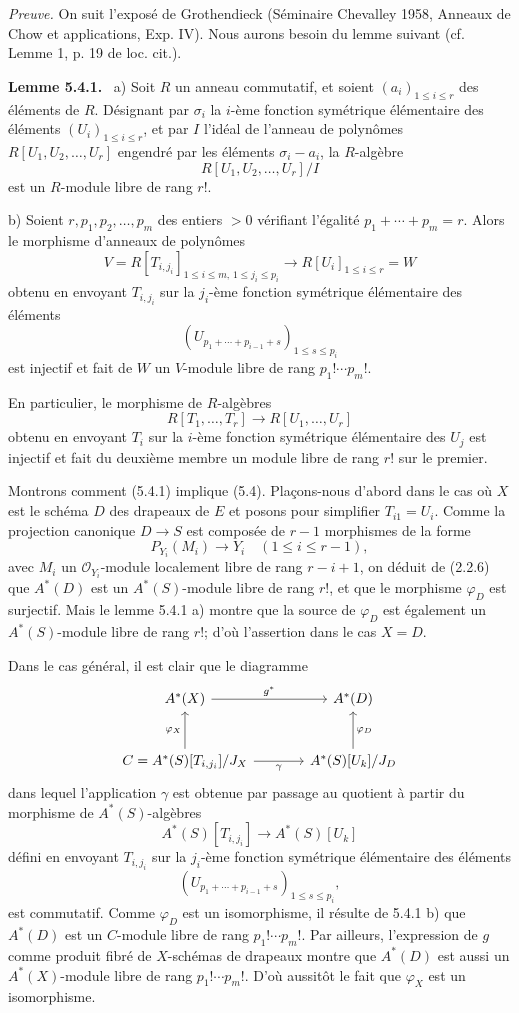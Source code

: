\documentclass[11pt]{article}
\newenvironment{statement}[1]{\par\medskip\noindent\textbf{#1.}\ }{\par\medskip}
\begin{document}
\emph{Preuve.} On suit l'exposé de Grothendieck (Séminaire Chevalley 1958, Anneaux de Chow et applications, Exp. IV). Nous aurons besoin du lemme suivant (cf. Lemme 1, p. 19 de loc. cit.).

\begin{statement}{Lemme 5.4.1}
a) Soit $R$ un anneau commutatif, et soient $(a_i)_{1\le i\le r}$ des éléments de $R$. Désignant par $\sigma_i$ la $i$-ème fonction symétrique élémentaire des éléments $(U_i)_{1\le i\le r}$, et par $I$ l'idéal de l'anneau de polynômes $R[U_1,U_2,\ldots,U_r]$ engendré par les éléments $\sigma_i-a_i$, la $R$-algèbre
\[
R[U_1,U_2,\ldots,U_r]/I
\]
est un $R$-module libre de rang $r!$.

b) Soient $r,p_1,p_2,\ldots,p_m$ des entiers $>0$ vérifiant l'égalité $p_1+\cdots+p_m=r$. Alors le morphisme d'anneaux de polynômes
\[
V=R[T_{i,j_i}]_{1\le i\le m,\,1\le j_i\le p_i}
\longrightarrow R[U_i]_{1\le i\le r}=W
\]
obtenu en envoyant $T_{i,j_i}$ sur la $j_i$-ème fonction symétrique élémentaire des éléments
\[
(U_{p_1+\cdots+p_{i-1}+s})_{1\le s\le p_i}
\]
est injectif et fait de $W$ un $V$-module libre de rang $p_1!\cdots p_m!$.

En particulier, le morphisme de $R$-algèbres
\[
R[T_1,\ldots,T_r]\to R[U_1,\ldots,U_r]
\]
obtenu en envoyant $T_i$ sur la $i$-ème fonction symétrique élémentaire des $U_j$ est injectif et fait du deuxième membre un module libre de rang $r!$ sur le premier.
\end{statement}

Montrons comment (5.4.1) implique (5.4). Plaçons-nous d'abord dans le cas où $X$ est le schéma $D$ des drapeaux de $E$ et posons pour simplifier $T_{i1}=U_i$. Comme la projection canonique $D\to S$ est composée de $r-1$ morphismes de la forme
\[
P_{Y_i}(M_i)\to Y_i\quad(1\le i\le r-1),
\]
avec $M_i$ un $\mathcal O_{Y_i}$-module localement libre de rang $r-i+1$, on déduit de (2.2.6) que $A^*(D)$ est un $A^*(S)$-module libre de rang $r!$, et que le morphisme $\varphi_D$ est surjectif. Mais le lemme 5.4.1 a) montre que la source de $\varphi_D$ est également un $A^*(S)$-module libre de rang $r!$; d'où l'assertion dans le cas $X=D$.

Dans le cas général, il est clair que le diagramme
\[
\begin{tikzcd}[column sep=large,row sep=large]
A^*(X) \arrow[r,"g^*"] & A^*(D)\\
C=A^*(S)[T_{i,j_i}]/J_X \arrow[u,"\varphi_X"] \arrow[r,"\gamma"'] &
A^*(S)[U_k]/J_D \arrow[u,"\varphi_D"']
\end{tikzcd}
\]
dans lequel l'application $\gamma$ est obtenue par passage au quotient à partir du morphisme de $A^*(S)$-algèbres
\[
A^*(S)[T_{i,j_i}]\to A^*(S)[U_k]
\]
défini en envoyant $T_{i,j_i}$ sur la $j_i$-ème fonction symétrique élémentaire des éléments
\[
(U_{p_1+\cdots+p_{i-1}+s})_{1\le s\le p_i},
\]
est commutatif. Comme $\varphi_D$ est un isomorphisme, il résulte de 5.4.1 b) que $A^*(D)$ est un $C$-module libre de rang $p_1!\cdots p_m!$. Par ailleurs, l'expression de $g$ comme produit fibré de $X$-schémas de drapeaux montre que $A^*(D)$ est aussi un $A^*(X)$-module libre de rang $p_1!\cdots p_m!$. D'où aussitôt le fait que $\varphi_X$ est un isomorphisme.
\end{document}

